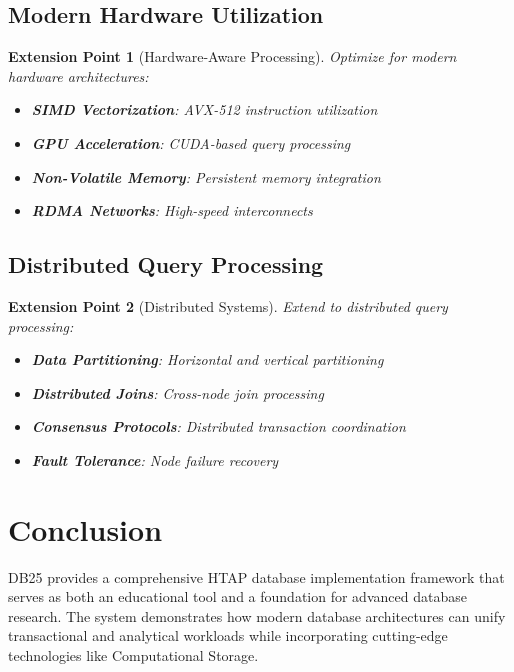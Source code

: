 \documentclass[12pt,a4paper]{article}
\newtheorem{extension}{Extension Point}[section]
\begin{document}
    \subsection{Modern Hardware Utilization}

    \begin{extension}[Hardware-Aware Processing]
        Optimize for modern hardware architectures:

        \begin{itemize}
            \item \textbf{SIMD Vectorization}: AVX-512 instruction utilization
            \item \textbf{GPU Acceleration}: CUDA-based query processing
            \item \textbf{Non-Volatile Memory}: Persistent memory integration
            \item \textbf{RDMA Networks}: High-speed interconnects
        \end{itemize}
    \end{extension}

    \subsection{Distributed Query Processing}

    \begin{extension}[Distributed Systems]
        Extend to distributed query processing:

        \begin{itemize}
            \item \textbf{Data Partitioning}: Horizontal and vertical partitioning
            \item \textbf{Distributed Joins}: Cross-node join processing
            \item \textbf{Consensus Protocols}: Distributed transaction coordination
            \item \textbf{Fault Tolerance}: Node failure recovery
        \end{itemize}
    \end{extension}

    \section{Conclusion}

    DB25 provides a comprehensive HTAP database implementation framework that serves as both an educational tool and a foundation for advanced database research. The system demonstrates how modern database architectures can unify transactional and analytical workloads while incorporating cutting-edge technologies like Computational Storage.
\end{document}
